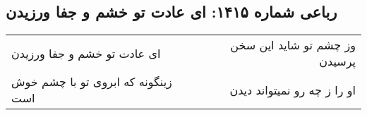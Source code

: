 \begin{center}
\section*{رباعی شماره ۱۴۱۵: ای عادت تو خشم و جفا ورزیدن}
\label{sec:1415}
\begin{longtable}{l p{0.5cm} r}
ای عادت تو خشم و جفا ورزیدن
&&
وز چشم تو شاید این سخن پرسیدن
\\
زینگونه که ابروی تو با چشم خوش است
&&
او را ز چه رو نمیتواند دیدن
\\
\end{longtable}
\end{center}
